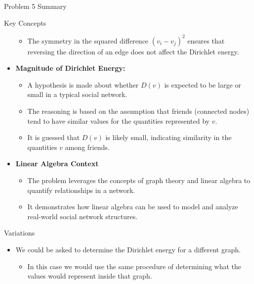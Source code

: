 \begin{summary}{Problem 5 Summary}
\begin{statement}{Key Concepts}
\begin{itemize}
\begin{itemize}
                \item The symmetry in the squared difference \((v_i - v_j)^2\) ensures that reversing the direction of an edge does not affect the Dirichlet energy.
            \end{itemize}
            \item \textbf{Magnitude of Dirichlet Energy:}
            \begin{itemize}
                \item A hypothesis is made about whether $D(v)$ is expected to be large or small in a typical social network.
                \item The reasoning is based on the assumption that friends (connected nodes) tend to have similar values for the quantities represented by $v$.
                \item It is guessed that $D(v)$ is likely small, indicating similarity in the quantities $v$ among friends.
            \end{itemize}
            \item \textbf{Linear Algebra Context}
            \begin{itemize}
                \item The problem leverages the concepts of graph theory and linear algebra to quantify relationships in a network.
                \item It demonstrates how linear algebra can be used to model and analyze real-world social network structures.
            \end{itemize}
        \end{itemize}
    \end{statement}
    \begin{statement}{Variations}
        \begin{itemize}
            \item We could be asked to determine the Dirichlet energy for a different graph.
            \begin{itemize}
                \item In this case we would use the same procedure of determining what the values would represent inside that graph.
            \end{itemize}
        \end{itemize}
    \end{statement}
\end{summary}

